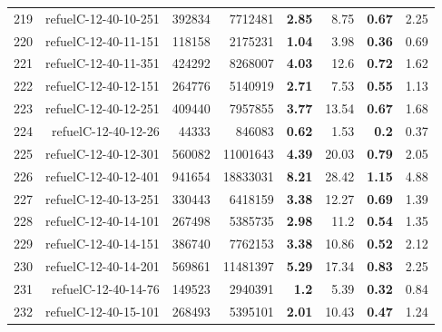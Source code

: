\begin{longtable}{lrr@{\hskip 12pt}r@{\hskip 12pt}r@{\hskip 12pt}r@{\hskip 12pt}r@{\hskip 12pt}r}
219 & \multirow{1}{*}{refuelC-12-40-10-251} & \multirow{1}{*}{392834} & \multirow{1}{*}{7712481} & \textbf{2.85} & 8.75 & \textbf{0.67} & 2.25 \\
220 & \multirow{1}{*}{refuelC-12-40-11-151} & \multirow{1}{*}{118158} & \multirow{1}{*}{2175231} & \textbf{1.04} & 3.98 & \textbf{0.36} & 0.69 \\
221 & \multirow{1}{*}{refuelC-12-40-11-351} & \multirow{1}{*}{424292} & \multirow{1}{*}{8268007} & \textbf{4.03} & 12.6 & \textbf{0.72} & 1.62 \\
222 & \multirow{1}{*}{refuelC-12-40-12-151} & \multirow{1}{*}{264776} & \multirow{1}{*}{5140919} & \textbf{2.71} & 7.53 & \textbf{0.55} & 1.13 \\
223 & \multirow{1}{*}{refuelC-12-40-12-251} & \multirow{1}{*}{409440} & \multirow{1}{*}{7957855} & \textbf{3.77} & 13.54 & \textbf{0.67} & 1.68 \\
224 & \multirow{1}{*}{refuelC-12-40-12-26} & \multirow{1}{*}{44333} & \multirow{1}{*}{846083} & \textbf{0.62} & 1.53 & \textbf{0.2} & 0.37 \\
225 & \multirow{1}{*}{refuelC-12-40-12-301} & \multirow{1}{*}{560082} & \multirow{1}{*}{11001643} & \textbf{4.39} & 20.03 & \textbf{0.79} & 2.05 \\
226 & \multirow{1}{*}{refuelC-12-40-12-401} & \multirow{1}{*}{941654} & \multirow{1}{*}{18833031} & \textbf{8.21} & 28.42 & \textbf{1.15} & 4.88 \\
227 & \multirow{1}{*}{refuelC-12-40-13-251} & \multirow{1}{*}{330443} & \multirow{1}{*}{6418159} & \textbf{3.38} & 12.27 & \textbf{0.69} & 1.39 \\
228 & \multirow{1}{*}{refuelC-12-40-14-101} & \multirow{1}{*}{267498} & \multirow{1}{*}{5385735} & \textbf{2.98} & 11.2 & \textbf{0.54} & 1.35 \\
229 & \multirow{1}{*}{refuelC-12-40-14-151} & \multirow{1}{*}{386740} & \multirow{1}{*}{7762153} & \textbf{3.38} & 10.86 & \textbf{0.52} & 2.12 \\
230 & \multirow{1}{*}{refuelC-12-40-14-201} & \multirow{1}{*}{569861} & \multirow{1}{*}{11481397} & \textbf{5.29} & 17.34 & \textbf{0.83} & 2.25 \\
231 & \multirow{1}{*}{refuelC-12-40-14-76} & \multirow{1}{*}{149523} & \multirow{1}{*}{2940391} & \textbf{1.2} & 5.39 & \textbf{0.32} & 0.84 \\
232 & \multirow{1}{*}{refuelC-12-40-15-101} & \multirow{1}{*}{268493} & \multirow{1}{*}{5395101} & \textbf{2.01} & 10.43 & \textbf{0.47} & 1.24 \\

\end{longtable}
